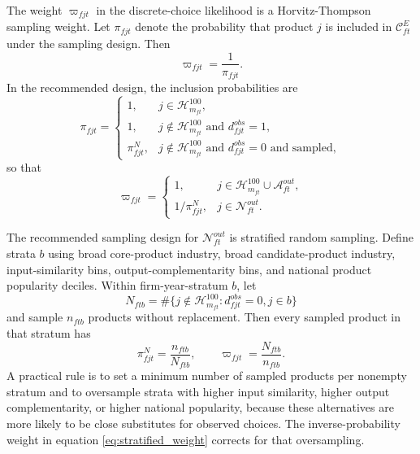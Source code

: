 \documentclass[11pt,a4paper]{article}
\newcommand{\mc}{\mathcal}
\begin{document}
The weight $\varpi_{fjt}$ in the discrete-choice likelihood is a Horvitz-Thompson sampling weight. Let $\pi_{fjt}$ denote the probability that product $j$ is included in $\mc{C}^{E}_{ft}$ under the sampling design. Then
\begin{equation}
    \varpi_{fjt}=\frac{1}{\pi_{fjt}}.
    \label{eq:sampling_weight_general}
\end{equation}
In the recommended design, the inclusion probabilities are
\begin{equation}
    \pi_{fjt}=\begin{cases}
        1, & j\in\mc{H}^{100}_{m_{ft}},\\
        1, & j\notin\mc{H}^{100}_{m_{ft}}\text{ and }d^{obs}_{fjt}=1,\\
        \pi^{N}_{fjt}, & j\notin\mc{H}^{100}_{m_{ft}}\text{ and }d^{obs}_{fjt}=0\text{ and sampled},
    \end{cases}
    \label{eq:sampling_prob}
\end{equation}
so that
\begin{equation}
    \varpi_{fjt}=\begin{cases}
        1, & j\in\mc{H}^{100}_{m_{ft}}\cup\mc{A}^{out}_{ft},\\
        1/\pi^{N}_{fjt}, & j\in\mc{N}^{out}_{ft}.
    \end{cases}
    \label{eq:sampling_weight}
\end{equation}

The recommended sampling design for $\mc{N}^{out}_{ft}$ is stratified random sampling. Define strata $b$ using broad core-product industry, broad candidate-product industry, input-similarity bins, output-complementarity bins, and national product popularity deciles. Within firm-year-stratum $b$, let
\[
    N_{ftb}=\#\{j\notin\mc{H}^{100}_{m_{ft}}:d^{obs}_{fjt}=0, j\in b\}
\]
and sample $n_{ftb}$ products without replacement. Then every sampled product in that stratum has
\begin{equation}
    \pi^{N}_{fjt}=\frac{n_{ftb}}{N_{ftb}},
    \qquad
    \varpi_{fjt}=\frac{N_{ftb}}{n_{ftb}}.
    \label{eq:stratified_weight}
\end{equation}
A practical rule is to set a minimum number of sampled products per nonempty stratum and to oversample strata with higher input similarity, higher output complementarity, or higher national popularity, because these alternatives are more likely to be close substitutes for observed choices. The inverse-probability weight in equation \eqref{eq:stratified_weight} corrects for that oversampling.
\end{document}
